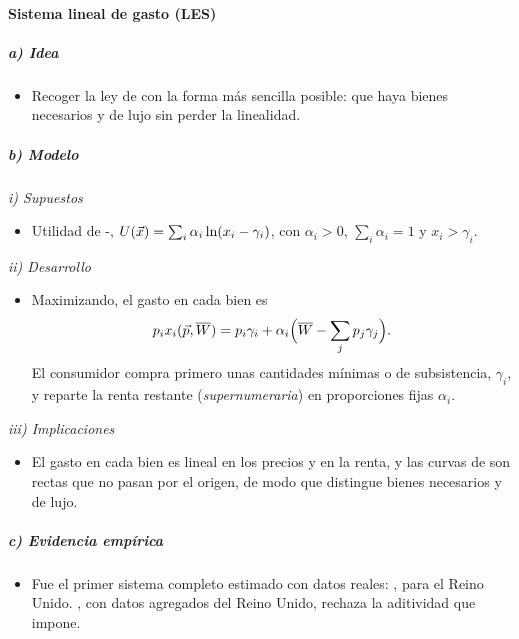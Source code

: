 \documentclass[11pt]{article}
\begin{document}
\paragraph{Sistema lineal de gasto (LES)}

\subparagraph{a) Idea}

\begin{itemize}
\item Recoger la ley de  con la forma más sencilla posible: que haya bienes necesarios y de lujo sin perder la linealidad.
\end{itemize}

\subparagraph{b) Modelo}

\hspace*{3.6em}\emph{i) Supuestos}

\begin{itemize}
\item Utilidad de -, $U(\vec{x})=\sum_i\alpha_i\ln(x_i-\gamma_i)$, con $\alpha_i>0$, $\sum_i\alpha_i=1$ y $x_i>\gamma_i$\nocite{KleinRubin1947Constant,Geary1950Note,Stone1954Linear}.
\end{itemize}

\hspace*{3.6em}\emph{ii) Desarrollo}

\begin{itemize}
\item Maximizando, el gasto en cada bien es
  \begin{equation}
  p_ix_i(\vec{p},\overline{W})=p_i\gamma_i+\alpha_i\Big(\overline{W}-\sum_jp_j\gamma_j\Big). \label{eq:les}
  \end{equation}
  El consumidor compra primero unas cantidades mínimas o de subsistencia, $\gamma_i$, y reparte la renta restante (\emph{supernumeraria}) en proporciones fijas $\alpha_i$.
\end{itemize}

\hspace*{3.6em}\emph{iii) Implicaciones}

\begin{itemize}
\item El gasto en cada bien es lineal en los precios y en la renta, y las curvas de  son rectas que no pasan por el origen, de modo que distingue bienes necesarios y de lujo.
\end{itemize}

\subparagraph{c) Evidencia empírica}

\begin{itemize}
\item Fue el primer sistema completo estimado con datos reales: \textcite{Stone1954Linear}, para el Reino Unido. \textcite{Deaton1974Analysis}, con datos agregados del Reino Unido, rechaza la aditividad que impone.
\end{itemize}
\end{document}
